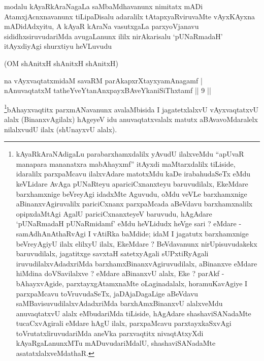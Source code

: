 \begin{artha}
modalu kAyaRkAraNagaLa saMbaMdhavanunx nimitatx mADi AtamxjAcnxnavanunx tiLipaDisalu adaralilx tAtapxyaRviruvaMte vAyxKAyxna mADidAdxyitu, A kAyaR kAraNa vasutxgaLa parxyoVjanavu sididhxsiruvudariMda avugaLanunx ililx nirAkarisalu `pUNaRmadaH' itAyxdiyAgi shurxtiyu heVLuvudu \mdash 
\end{artha}

\begin{center}
(OM shAnitxH shAnitxH shAnitxH)
\end{center}


\begin{shl}
na vAyxvaqtatxmidaM savaRM parAkapxrXtayxyamAnagamf  | \\
nAnuvaqtatxM tatheYveYtanAnxpayxBAveYkaniSiThxtamf \hfill||  9 ||  
\end{shl}

\begin{artha}
\footnote{kAyaRkAraNAdigaLu parabarxhamxdalilx yAvudU ilalxveMdu ``apUvaR manapara mananatxra mabAhayxmf'' itAyxdi maMtarxdalilx tiLiside, idaralilx parxpaMcavu ilalxvAdare matotxMdu kaDe irabahudaSeTx eMdu keVLidare AvAga pUNaRteyu apariciCxnanxteyu baruvudilalx, EkeMdare barxhamxnige beVreyAgi idadxMte Aguvudu, oMdu veVLe barxhamxnige aBinanxvAgiruvalilx pariciCxnanx parxpaMcada aBeVdavu barxhamxnalilx opipxdaMtAgi AgalU pariciCxnanxteyeV baruvudu, hAgAdare `pUNaRmadaH pUNaRmidamf' eMdu heVLidudx heVge sari ? eMdare - samAdhAnAthaRvAgi I vAtiRka baMdide; idaM I jagatutx barxhamxnige beVreyAgiyU ilalx elilxyU ilalx, EkeMdare ? BeVdavanunx nirUpisuvudakekx baruvudilalx, jagatitxge savxtaH satetxyAgali sUPxtiRyAgali iruvudilalxvAdadxriMda barxhamxBinanxvAgiruvudilalx, aBinanxve eMdare hiMdina doVSavilalxve ? eMdare aBinanxvU alalx, Eke ? parAkf - bAhayxvAgide, parxtayxgAtamxnaMte oLaginadalalx, horamuKavAgiye I parxpaMcavu toVruvudaSeTx, jaDAjaDagaLige aBeVdavu saMBavisuvudilalxvAdadxriMda barxhAmxBinanxvU alalxveMdu anuvaqtatxvU alalx eMbudariMda tiLiside, hAgAdare shashaviSANadaMte tucaCxvAgirali eMdare hAgU ilalx, parxpaMcavu parxtayxkaSxvAgi toVrutatxliruvudariMda aneVka parxvaqtitx nivaqtAtxyXdi kAyaRgaLanunxMTu mADuvudariMdalU, shashaviSANadaMte asatatxlalxveMdathaR.}bAhayxvaqtitx parxmANavanunx avalaMbisida I jagatetxlalxvU vAyxvaqtatxvU alalx (BinanxvAgilalx) hAgeyeV idu anuvaqtatxvalalx matutx aBAvavoMdaralelx nilalxvudU ilalx (shUnayxvU alalx).
\end{artha}

